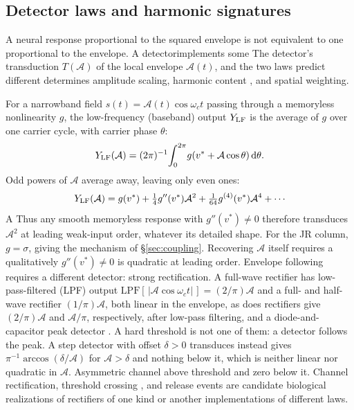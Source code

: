 \documentclass[11pt,a4paper]{article}
\newcommand{\Sig}{\sigma}
\providecommand{\DIFaddtex}[1]{{\protect\color{blue} \sf #1}} %
\providecommand{\DIFdeltex}[1]{{\protect\color{red} \scriptsize #1}} %
\providecommand{\DIFaddbegin}{} %
\providecommand{\DIFaddend}{} %
\providecommand{\DIFdelbegin}{} %
\providecommand{\DIFdelend}{} %
\providecommand{\DIFadd}[1]{\texorpdfstring{\DIFaddtex{#1}}{#1}} %
\providecommand{\DIFdel}[1]{\texorpdfstring{\DIFdeltex{#1}}{}} %
\begin{document}
\subsection{Detector laws and harmonic signatures}\label{sec:transduction}
\DIFdelbegin \DIFdel{A neural response proportional to the squared envelope is not equivalent to one
proportional to the envelope. A detectorimplements some }\DIFdelend \DIFaddbegin \DIFadd{The detector's }\DIFaddend transduction $T(\mathcal A)$ \DIFdelbegin \DIFdel{of the local
envelope $\mathcal A(t)$, and the two laws predict different }\DIFdelend \DIFaddbegin \DIFadd{determines }\DIFaddend amplitude scaling,
harmonic content\DIFaddbegin \DIFadd{, }\DIFaddend and spatial weighting.

For a narrowband field $s(t)=\mathcal A(t)\cos\omega_c t$ passing through a memoryless nonlinearity
$g$, the low-frequency (baseband) output $Y_{\rm LF}$ is the average of $g$ over one
carrier cycle, with carrier phase $\theta$:
\[
Y_{\rm LF}(\mathcal A)=(2\pi)^{-1}\!\int_0^{2\pi}\!g(v^*+\mathcal A\cos\theta)\,\mathrm{d}\theta.
\]
Odd powers of $\mathcal A$ average away, leaving only even ones:
\begin{equation}
Y_{\rm LF}(\mathcal A)=g(v^*)+\tfrac14 g''(v^*)\mathcal A^2+\tfrac1{64}g^{(4)}(v^*)\mathcal A^4+\cdots
\label{eq:cycavg}
\end{equation}
\DIFdelbegin \DIFdel{A }\DIFdelend \DIFaddbegin \DIFadd{Thus any }\DIFaddend smooth memoryless response with \DIFdelbegin \DIFdel{$g''(v^*)\neq0$ therefore transduces $\mathcal A^2$ at
leading weak-input order, whatever its detailed shape. For the JR column, $g=\Sig$, giving the
mechanism of \S\ref{sec:coupling}. Recovering $\mathcal A$ itself requires a qualitatively
}\DIFdelend \DIFaddbegin \DIFadd{$g''(v^*)\ne0$ is quadratic at
leading order. Envelope following requires a }\DIFaddend different detector: \DIFdelbegin \DIFdel{strong rectification. A full-wave rectifier has low-pass-filtered (LPF) output
$\mathrm{LPF}[\,|\mathcal A\cos\omega_c t|\,]=(2/\pi)\mathcal A$ and
a }\DIFdelend \DIFaddbegin \DIFadd{full- and
}\DIFaddend half-wave \DIFdelbegin \DIFdel{rectifier
$(1/\pi)\mathcal A$, both linear in the envelope,
as does }\DIFdelend \DIFaddbegin \DIFadd{rectifiers give $(2/\pi)\mathcal A$ and $\mathcal A/\pi$, respectively,
after low-pass filtering, and }\DIFaddend a diode-and-capacitor \DIFdelbegin \DIFdel{peak detector .
A hard threshold is not one of them: a }\DIFdelend \DIFaddbegin \DIFadd{detector follows the peak.
A }\DIFaddend step detector with offset $\delta>0$ \DIFdelbegin \DIFdel{transduces
}\DIFdelend \DIFaddbegin \DIFadd{instead gives
}\DIFaddend $\pi^{-1}\arccos(\delta/\mathcal A)$ \DIFdelbegin \DIFdel{for $\mathcal A>\delta$ and nothing below it, which is neither linear
nor quadratic in $\mathcal A$.
Asymmetric channel }\DIFdelend \DIFaddbegin \DIFadd{above threshold and zero below it.
Channel }\DIFaddend rectification, threshold crossing\DIFaddbegin \DIFadd{, }\DIFaddend and release events are candidate
biological \DIFdelbegin \DIFdel{realizations of rectifiers of one
kind or another}\DIFdelend \DIFaddbegin \DIFadd{implementations of different laws}\DIFaddend .
\end{document}
